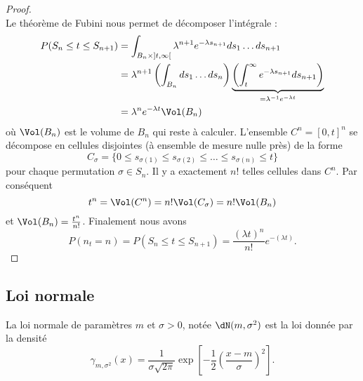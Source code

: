 \begin{proof}
\begin{equation}
\end{equation}
Le théorème de Fubini nous permet de décomposer l'intégrale :
\begin{subequations}
    \begin{align}
        P(S_n\leq t\leq S_{n+1})&=\int_{B_n\times\mathopen] t , \infty \mathclose[}\lambda^{n+1} e^{-\lambda s_{n+1}}ds_1\ldots ds_{n+1}\\
        &=\lambda^{n+1}\left( \int_{B_n}ds_1\ldots ds_n \right)\underbrace{\left( \int_t^{\infty} e^{-\lambda s_{n+1}}ds_{n+1} \right)}_{=\lambda^{-1} e^{-\lambda t}}\\
        &=\lambda^n e^{-\lambda t}\Vol(B_n)
    \end{align}
\end{subequations}
où \( \Vol(B_n)\) est le volume de \( B_n\) qui reste à calculer. L'ensemble \( C^n=[0,t]^n\) se décompose en cellules disjointes (à ensemble de mesure nulle près) de la forme
\begin{equation}
    C_{\sigma}=\{ 0\leq s_{\sigma(1)}\leq s_{\sigma(2)}\leq\ldots\leq s_{\sigma(n)}\leq t \}
\end{equation}
pour chaque permutation \( \sigma\in S_n\). Il y a exactement \( n!\) telles cellules dans \( C^n\). Par conséquent
\begin{equation}
    t^n=\Vol(C^n)=n!\Vol(C_{\sigma})=n!\Vol(B_n)
\end{equation}
et \( \Vol(B_n)=\frac{ t^n }{ n! }\). Finalement nous avons
\begin{equation}
    P(n_t=n)=P(S_n\leq t\leq S_{n+1})=\frac{ (\lambda t)^n }{ n! } e^{-(\lambda t)}.
\end{equation}
    
\end{proof}

\subsection{Loi normale}

La loi normale de paramètres \( m\) et \( \sigma>0\), notée \( \dN(m,\sigma^2)\) est la loi donnée par la densité
\begin{equation}
    \gamma_{m,\sigma^2}(x)=\frac{1}{ \sigma\sqrt{2\pi} }\exp\left[ -\frac{ 1 }{2}\left( \frac{ x-m }{ \sigma } \right)^2 \right].
\end{equation}


